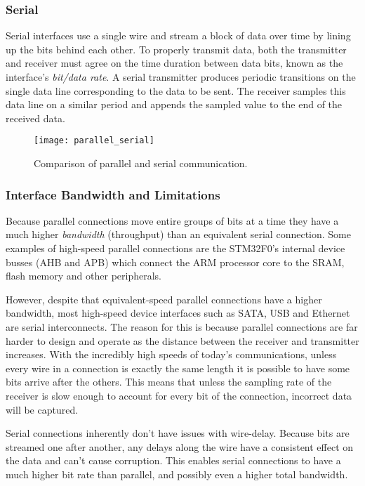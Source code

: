 \documentclass[openany,11pt,fleqn]{book} %
\begin{document}
\subsubsection{Serial}
Serial interfaces use a single wire and stream a block of data over time by lining up the bits behind each other. To properly transmit data, both the transmitter and receiver must agree on the time duration between data bits, known as the interface's \textit{bit/data rate}. A serial transmitter produces periodic transitions on the single data line corresponding to the data to be sent. The receiver samples this data line on a similar period and appends the sampled value to the end of the received data. 

\begin{figure}[]
    \centering\texttt{[image: parallel\_serial]}
    \caption{Comparison of parallel and serial communication.}
    \label{parallel_serial}
\end{figure}

\subsubsection{Interface Bandwidth and Limitations}
Because parallel connections move entire groups of bits at a time they have a much higher \textit{bandwidth} (throughput) than an equivalent serial connection. Some examples of high-speed parallel connections are the STM32F0's internal device busses (AHB and APB) which connect the ARM processor core to the SRAM, flash memory and other peripherals.

However, despite that equivalent-speed parallel connections have a higher bandwidth, most high-speed device interfaces such as SATA, USB and Ethernet are serial interconnects. The reason for this is because parallel connections are far harder to design and operate as the distance between the receiver and transmitter increases. With the incredibly high speeds of today's communications, unless every wire in a connection is exactly the same length it is possible to have some bits arrive after the others. This means that unless the sampling rate of the receiver is slow enough to account for every bit of the connection, incorrect data will be captured.

Serial connections inherently don't have issues with wire-delay. Because bits are streamed one after another, any delays along the wire have a consistent effect on the data and can't cause corruption. This enables serial connections to have a much higher bit rate than parallel, and possibly even a higher total bandwidth.
\end{document}
